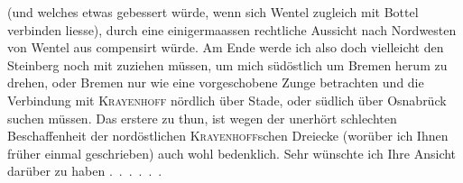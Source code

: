 \noindent (und welches etwas gebessert würde, wenn sich Wentel zugleich mit Bottel verbinden liesse), durch eine einigermaassen rechtliche Aussicht nach Nordwesten von Wentel aus compensirt würde.
Am Ende werde ich also doch vielleicht den Steinberg noch mit zuziehen müssen, um mich südöstlich um Bremen herum zu drehen, oder Bremen nur wie eine vorgeschobene Zunge betrachten und die Verbindung mit \textsc{Krayenhoff} nördlich über Stade, oder südlich über Osnabrück suchen müssen.
Das erstere  zu thun, ist wegen der unerhört schlechten Beschaffenheit der nordöstlichen \textsc{Krayenhoff}schen Dreiecke (worüber ich Ihnen früher einmal geschrieben) auch wohl bedenklich.
Sehr wünschte ich Ihre Ansicht darüber zu haben .\ .\ .\ .\ .\ .
